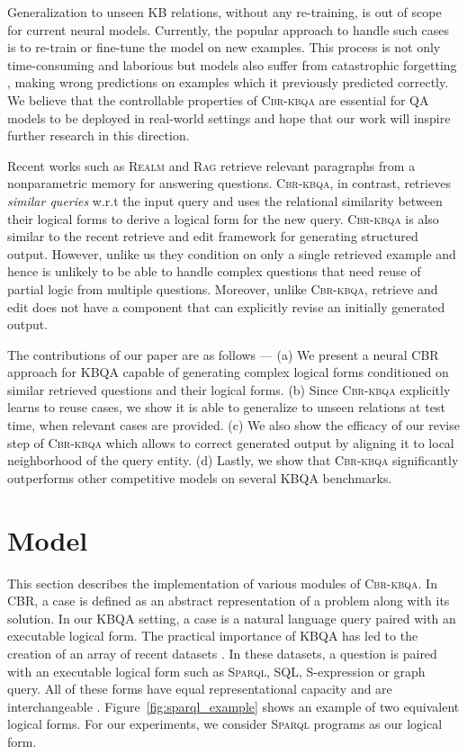 \documentclass[11pt]{article}
\newcommand{\spql}{\textsc{Sparql}\xspace}
\newcommand{\alg}{\textsc{Cbr-kbqa}\xspace}
\begin{document}
Generalization to unseen KB relations, without any re-training, is out of scope for current neural models. Currently, the popular approach to handle such cases is to re-train or fine-tune the model on new examples. This process is not only time-consuming and laborious but models also suffer from catastrophic forgetting \cite{hinton1987using,kirkpatrick2017overcoming}, making wrong predictions on examples which it previously predicted correctly. We believe that the controllable properties of \alg are essential for QA models to be deployed in real-world settings and hope that our work will inspire further research in this direction.

Recent works such as \textsc{Realm} \cite{guu2020realm} and \textsc{Rag} \cite{lewis2020retrieval} retrieve relevant paragraphs from a nonparametric memory for answering questions. \alg, in contrast, retrieves \emph{similar queries} w.r.t the input query and uses the relational similarity between their logical forms to derive a logical form for the new query. \alg is also similar to the recent retrieve and edit framework \cite{hashimoto2018retrieve} for generating structured output. However, unlike us they condition on only a single retrieved example and hence is unlikely to be able to handle  complex questions that need reuse of partial logic from multiple questions. Moreover, unlike \alg, retrieve and edit does not have a component that can explicitly revise an initially generated output.

The contributions of our paper are as follows --- (a) We present a neural CBR approach for KBQA capable of generating complex logical forms conditioned on similar retrieved questions and their logical forms. (b) Since \alg explicitly learns to reuse cases, we show it is able to generalize to unseen relations at test time, when relevant cases are provided. (c) We also show the efficacy of our revise step of \alg which allows to correct generated output by aligning it to local neighborhood of the query entity. (d) Lastly, we show that \alg significantly outperforms other competitive models on several KBQA benchmarks.
 
\section{Model}
\label{sec:model}
This section describes the implementation of various modules of \alg. In CBR, a case is defined as an abstract representation of a problem along with its solution. In our KBQA setting, a case is a natural language query paired with an executable logical form. The practical importance of KBQA has led to the creation of an array of recent datasets \citep[inter-alia]{zelle1996learning,bordes2015large,su2016generating,yih2016value,zhong2017seq2sql,ngomo20189th,yu2018spider,Talmor2018TheWA}. In these datasets, a question is paired with an executable logical form such as \spql, \textsc{SQL}, S-expression or graph query. All of these forms have equal representational capacity and are interchangeable \cite{su2016generating}. Figure~\ref{fig:sparql_example} shows an example of two equivalent logical forms. For our experiments, we consider \spql programs as our logical form.
\end{document}
